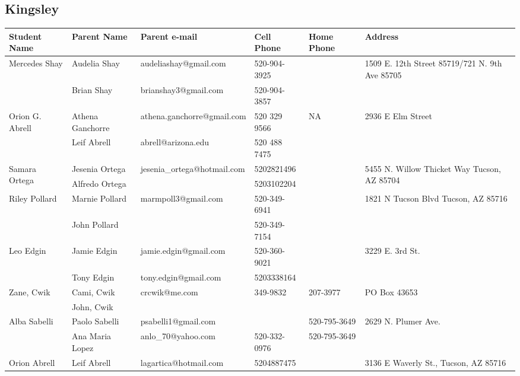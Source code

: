 \documentclass[landscape]{article}\usepackage[]{graphicx}\usepackage[]{color}
\begin{document}
\subsection{Kingsley}
\begin{longtable}{p{70pt}|p{75pt}|p{120pt}|p{60pt}|p{60pt}|p{120pt}|}
Student Name & Parent Name & Parent e-mail & Cell Phone & Home Phone & Address\\
\hline
\multirow{2}{70pt}{Mercedes Shay} & Audelia Shay  & audeliashay@gmail.com & 520-904-3925 &  & \multirow{2}{100pt}{1509 E. 12th Street 85719/721 N. 9th Ave 85705} \\
 & Brian Shay & brianshay3@gmail.com & 520-904-3857 &  & \\
\hline
\multirow{2}{70pt}{Orion G. Abrell} & Athena Ganchorre & athena.ganchorre@gmail.com & 520 329 9566 & NA & \multirow{2}{100pt}{2936 E Elm Street} \\
 & Leif Abrell & abrell@arizona.edu & 520 488 7475 &  & \\
\hline
\multirow{2}{70pt}{Samara Ortega} & Jesenia Ortega & jesenia\_ortega@hotmail.com & 5202821496 &  & \multirow{2}{100pt}{5455 N. Willow Thicket Way Tucson, AZ 85704} \\
 & Alfredo Ortega &  & 5203102204 &  & \\
\hline
\multirow{2}{70pt}{Riley Pollard} & Marnie Pollard & marmpoll3@gmail.com & 520-349-6941 &  & \multirow{2}{100pt}{1821 N Tucson Blvd Tucson, AZ 85716} \\
 & John Pollard &  & 520-349-7154 &  & \\
\hline
\multirow{2}{70pt}{Leo Edgin} & Jamie Edgin & jamie.edgin@gmail.com & 520-360-9021 &  & \multirow{2}{100pt}{3229 E. 3rd St.} \\
 & Tony Edgin & tony.edgin@gmail.com & 5203338164 &  & \\
\hline
\multirow{2}{70pt}{Zane, Cwik} & Cami, Cwik & crcwik@me.com & 349-9832 & 207-3977 & \multirow{2}{100pt}{PO Box 43653} \\
 & John, Cwik  &  &  &  & \\
\hline
\multirow{2}{70pt}{Alba Sabelli} & Paolo Sabelli & psabelli1@gmail.com &  & 520-795-3649 & \multirow{2}{100pt}{2629 N. Plumer Ave.} \\
 & Ana Maria Lopez & anlo\_70@yahoo.com & 520-332-0976 & 520-795-3649 & \\
\hline
\multirow{2}{70pt}{Orion Abrell} & Leif Abrell & lagartica@hotmail.com & 5204887475 &  & \multirow{2}{100pt}{3136 E Waverly St., Tucson, AZ 85716} \\

\end{longtable}
\end{document}
